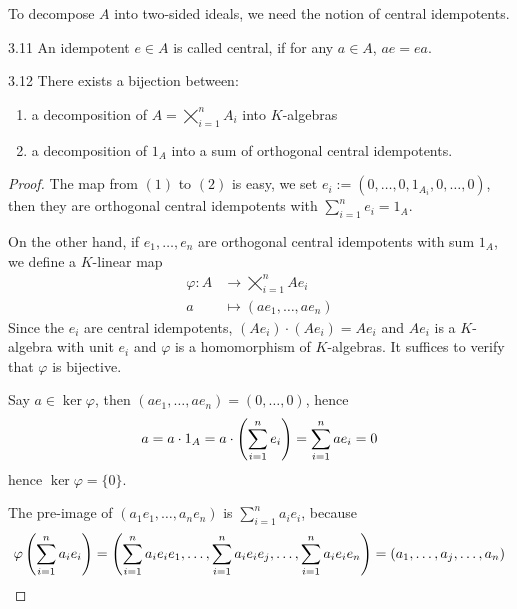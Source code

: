 \documentclass[twoside = false,	%
		headsepline,		%
		parskip = true,
		]{scrbook}						%
\begin{document}
    To decompose $A$ into two-sided ideals, we need the notion of central idempotents.

    \begin{definition}{}{3.11}
        An idempotent $e \in A$ is called central, if for any $a \in A$, $ae = ea$.
    \end{definition}

    \begin{corollary}{}{3.12}
        There exists a bijection between:
        \begin{enumerate}
            \item a decomposition of $A = \bigtimes\limits_{i=1}^n A_i$ into $K$-algebras
            \item a decomposition of $1_A$ into a sum of orthogonal central idempotents.
        \end{enumerate}
    \end{corollary}

    \begin{proof}
        The map from $(1)$ to $(2)$ is easy, we set $e_i := (0,\dots,0,1_{A_i},0 ,\dots,0)$, then they are orthogonal central idempotents with $\sum_{i=1}^n e_i = 1_A$.

        On the other hand, if $e_1,\dots,e_n$ are orthogonal central idempotents with sum $1_A$, we define a $K$-linear map
        \begin{equation*}
        \begin{split}
            \varphi: A &\to \bigtimes_{i=1}^n A e_i \\
                    a &\mapsto (ae_1, \dots, ae_n)
        \end{split}
        \end{equation*}
        Since the $e_i$ are central idempotents, $(Ae_i) \cdot (Ae_i) = Ae_i$ and $Ae_i$ is a $K$-algebra with unit $e_i$ and $\varphi$ is a homomorphism of $K$-algebras. It suffices to verify that $\varphi$ is bijective.

        Say $a \in \ker \varphi$, then $(ae_1,\dots,ae_n) = (0,\dots,0)$, hence
        \begin{equation*}
            a = a \cdot 1_A = a \cdot \left( \sum_{i=1}^n e_i\right) = \sum_{i=1}^n ae_i = 0
        \end{equation*}
        hence $\ker \varphi = \{0\}$.

        The pre-image of $(a_1e_1,\dots,a_ne_n)$ is $\sum_{i=1}^n a_ie_i$, because
        \begin{equation*}
            \varphi \left( \sum_{i=1}^n a_ie_i\right) = \left( \sum_{i=1}^n a_ie_i e_1,\dots,\sum_{i=1}^n a_ie_i e_j,\dots, \sum_{i=1}^n a_ie_i e_n\right) = \left( a_1,\dots,a_j,\dots,a_n\right)
        \end{equation*}
    \end{proof}
\end{document}

